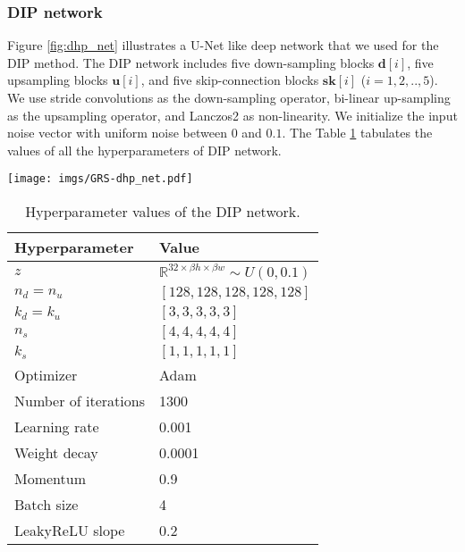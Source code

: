\documentclass[journal]{IEEEtran}
\begin{document}
\subsubsection{DIP network}
    \label{sec: DIP_network}
    \par Figure \ref{fig:dhp_net} illustrates a U-Net like deep network that we used for the DIP method. The DIP network includes five down-sampling blocks $\mathbf{d}[i]$, five upsampling blocks $\mathbf{u}[i]$, and five skip-connection blocks $\mathbf{sk}[i]$ ($i=1,2,..,5$). We use stride convolutions as the down-sampling operator, bi-linear up-sampling as the upsampling operator, and Lanczos2 as non-linearity.  We initialize the input noise vector with uniform noise between $0$ and $0.1$. The Table \ref{tab:dip_hyper} tabulates the values of all the hyperparameters of DIP network.
    \begin{figure*}[tb]
        \centering
        \texttt{[image: imgs/GRS-dhp\_net.pdf]}
        \caption{The DIP network utilized for the up-sampling process. The DIP network is a U-Net like network which consists of five down-sampling blocks $\mathbf{d}[i]$, five upsampling blocks $\mathbf{u}[i]$, and five skip-connection blocks $\mathbf{sk}[i]$ ($i=1,2,..,5$). The values of all the hyperparameters of DIP network is summarized in Table \ref{tab:dip_hyper}.}
        \label{fig:dhp_net}
    \end{figure*}
    
    \begin{table}[tb]
        \centering
        \caption{Hyperparameter values of the DIP network.}
        \begin{tabular}{ll}
            \hline
            Hyperparameter &  Value\\
            \hline
            $z$  & $\mathbb{R}^{32 \times \beta h \times \beta w} \sim U(0, 0.1)$\\
            $n_d = n_u$ & $[128, 128, 128, 128, 128]$\\
            $k_d = k_u$ & $[3, 3, 3, 3, 3]$\\
            $n_s$ & $[4, 4, 4, 4, 4]$\\
            $k_s$ & $[1, 1, 1, 1, 1]$\\
            Optimizer       & Adam\\
            Number of iterations        & 1300\\
            Learning rate   & 0.001\\
            Weight decay    & 0.0001\\
            Momentum        & 0.9\\
            Batch size      & 4\\
            LeakyReLU slope & 0.2\\
            \hline
        \end{tabular}
        \label{tab:dip_hyper}
    \end{table}
    
\end{document}

